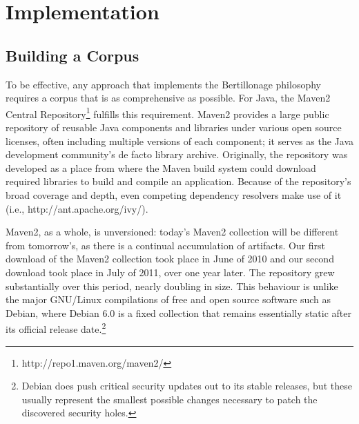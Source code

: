 \section{Implementation
    }

\subsection{Building a Corpus}

To be effective, any approach that implements the Bertillonage philosophy
requires a corpus that is as comprehensive as possible. For Java, the
Maven2 Central Repository\footnote{http://repo1.maven.org/maven2/} fulfills
this requirement.  Maven2 provides a large public repository of reusable
Java components and libraries under various open source licenses, often
including multiple versions of each component; it serves as the Java
development community's de facto library archive.  Originally, the
repository was developed as a place from where the Maven build system could
download required libraries to build and compile an application.   Because
of the repository's broad coverage and depth, even competing dependency
resolvers make use of it (i.e., http://ant.apache.org/ivy/).

Maven2, as a whole, is unversioned: today's Maven2 collection will be
different from tomorrow's, as there is a continual accumulation of
artifacts.  Our first download of the Maven2 collection took place in June
of 2010 and our second download took place in July of 2011, over one year
later.  The repository grew substantially over this period, nearly doubling
in size.  This behaviour is unlike the major GNU/Linux compilations of free
and open source software such as Debian, where Debian 6.0 is a fixed
collection that remains essentially static
after its official release date.\footnote{
Debian does push critical security updates out to its stable releases,
but these usually represent the smallest possible changes necessary to patch
the discovered security holes.}






